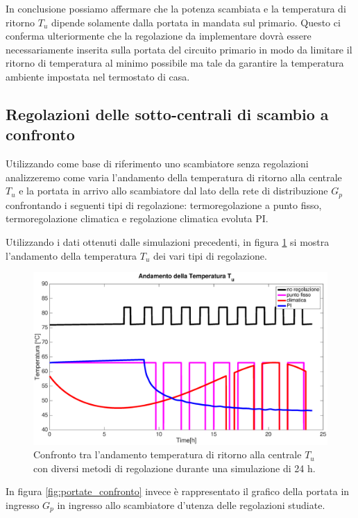 \documentclass[laurea,oneside,11pt]{USiena_tesiLM}
\begin{document}
In conclusione possiamo affermare che la potenza scambiata e la temperatura di ritorno $T_u$ dipende solamente dalla portata in mandata sul primario.
Questo ci conferma ulteriormente che la regolazione da implementare dovrà essere necessariamente inserita sulla portata del circuito primario in modo da limitare il ritorno di temperatura al minimo possibile ma tale da garantire la temperatura ambiente impostata nel termostato di casa.

\subsection{Regolazioni delle sotto-centrali di scambio a confronto}
Utilizzando come base di riferimento uno scambiatore senza regolazioni analizzeremo come varia l'andamento della temperatura di ritorno alla centrale $T_u$ e la portata in arrivo allo scambiatore dal lato della rete di distribuzione $G_p$ confrontando i seguenti tipi di regolazione: termoregolazione a punto fisso, termoregolazione climatica e regolazione climatica evoluta PI.

Utilizzando i dati ottenuti dalle simulazioni precedenti, in figura \ref{fig:To_confronto}  si mostra l'andamento della  temperatura $T_u$ dei vari tipi di regolazione.

\begin{figure}[!ht]
\centering
\includegraphics[width=\textwidth]{figure/To_confronto} 
\caption{Confronto tra l'andamento temperatura di ritorno alla centrale $T_u$ con diversi metodi di regolazione durante una simulazione di 24 h.}
\label{fig:To_confronto}
\end{figure}

In figura \ref{fig:portate_confronto} invece è rappresentato il grafico della portata in ingresso $G_p$ in ingresso allo scambiatore d'utenza delle regolazioni studiate. 
\end{document}
